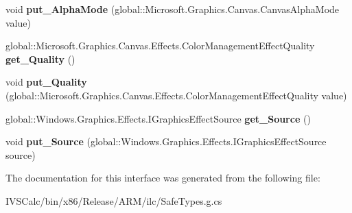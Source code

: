 \begin{DoxyCompactItemize}
void {\bfseries put\+\_\+\+Alpha\+Mode} (global\+::\+Microsoft.\+Graphics.\+Canvas.\+Canvas\+Alpha\+Mode value)
\item 
\mbox{\label{interface_microsoft_1_1_graphics_1_1_canvas_1_1_effects_1_1_i_color_management_effect_a89c6320a78dd9ee2ea791a82ba659f20}} 
global\+::\+Microsoft.\+Graphics.\+Canvas.\+Effects.\+Color\+Management\+Effect\+Quality {\bfseries get\+\_\+\+Quality} ()
\item 
\mbox{\label{interface_microsoft_1_1_graphics_1_1_canvas_1_1_effects_1_1_i_color_management_effect_a447e32036c75c68edbb85d92ede18c3b}} 
void {\bfseries put\+\_\+\+Quality} (global\+::\+Microsoft.\+Graphics.\+Canvas.\+Effects.\+Color\+Management\+Effect\+Quality value)
\item 
\mbox{\label{interface_microsoft_1_1_graphics_1_1_canvas_1_1_effects_1_1_i_color_management_effect_a836413a00b466fca673e824579e980b1}} 
global\+::\+Windows.\+Graphics.\+Effects.\+I\+Graphics\+Effect\+Source {\bfseries get\+\_\+\+Source} ()
\item 
\mbox{\label{interface_microsoft_1_1_graphics_1_1_canvas_1_1_effects_1_1_i_color_management_effect_a606468f964e7f248f59152b490d12d58}} 
void {\bfseries put\+\_\+\+Source} (global\+::\+Windows.\+Graphics.\+Effects.\+I\+Graphics\+Effect\+Source source)
\end{DoxyCompactItemize}


The documentation for this interface was generated from the following file\+:\begin{DoxyCompactItemize}
\item 
I\+V\+S\+Calc/bin/x86/\+Release/\+A\+R\+M/ilc/Safe\+Types.\+g.\+cs\end{DoxyCompactItemize}
